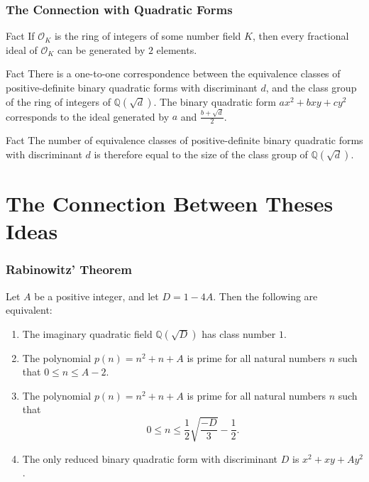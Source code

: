 \documentclass{beamer}
\begin{document}
\begin{frame}
	
	\frametitle{The Connection with Quadratic Forms}

	\begin{block}{Fact}
		If $\mathcal{O}_K$ is the ring of integers of some number field $K$, then every fractional ideal of $\mathcal{O}_K$ can be generated by $2$ elements.
	\end{block}
	\pause

	\begin{block}{Fact}
		There is a one-to-one correspondence between the equivalence classes of positive-definite binary quadratic forms with discriminant $d$, and the class group of the ring of integers of $\mathbb{Q}(\sqrt{d})$. The binary quadratic form $ax^2 + bxy + cy^2$ corresponds to the ideal generated by $a$ and $\frac{b + \sqrt{d}}{2}$.
	\end{block}
	\pause

	\begin{block}{Fact}
		The number of equivalence classes of positive-definite binary quadratic forms with discriminant $d$ is therefore equal to the size of the class group of $\mathbb{Q}(\sqrt{d})$.
	\end{block}

\end{frame}

\section{The Connection Between Theses Ideas}

\begin{frame}

	\frametitle{Rabinowitz' Theorem}

	\begin{theorem}
	Let $A$ be a positive integer, and let $D = 1 - 4A$. Then the following are equivalent:
	\begin{enumerate}
		\item The imaginary quadratic field $\mathbb{Q}(\sqrt{D})$ has class number $1$.
		\item The polynomial $p(n) = n^2 + n + A$ is prime for all natural numbers $n$ such that $0 \leq n \leq A - 2$.
		\item The polynomial $p(n) = n^2 + n + A$ is prime for all natural numbers $n$ such that
			\[
				0 \leq n \leq \frac{1}{2} \sqrt{\frac{-D}{3}} - \frac{1}{2}.
			\]
		\item The only reduced binary quadratic form with discriminant $D$ is $x^2 + xy + Ay^2$.
	\end{enumerate}
\end{theorem}

\end{frame}
\end{document}
